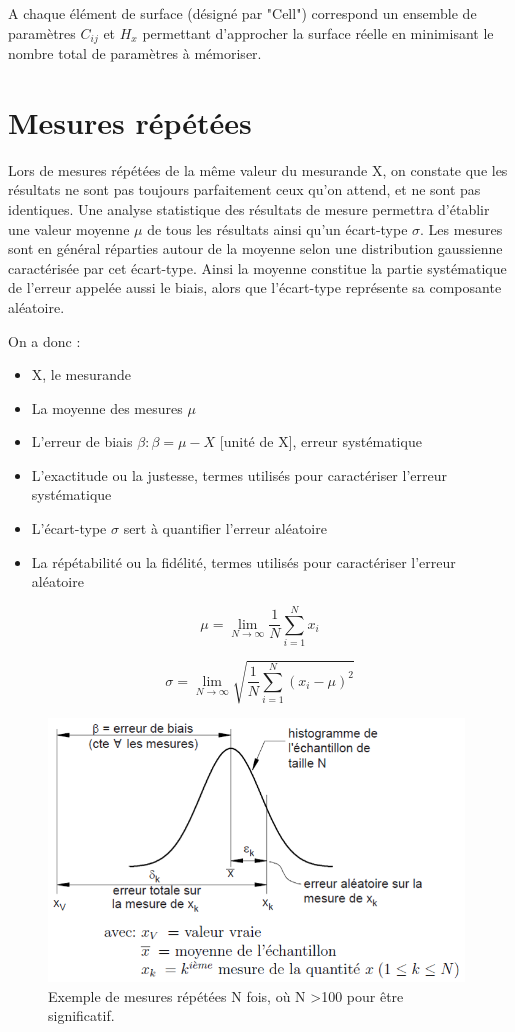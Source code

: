 A chaque élément de surface (désigné par "Cell") correspond un ensemble de paramètres $C_{ij}$ et $H_x$ permettant d'approcher la surface réelle en minimisant le nombre total de paramètres à mémoriser.

\section{Mesures répétées}

Lors de mesures répétées de la même valeur du mesurande X, on constate que les résultats ne sont pas toujours parfaitement ceux qu'on attend, et ne sont pas identiques. Une analyse statistique des résultats de mesure permettra d'établir une valeur moyenne $\mu$ de tous les résultats ainsi qu'un écart-type $\sigma$. Les mesures sont en général réparties autour de la moyenne selon une distribution gaussienne caractérisée par cet écart-type. Ainsi la moyenne constitue la partie systématique de l'erreur appelée aussi le biais, alors que l'écart-type représente sa composante aléatoire.

\newpage
On a donc :
\begin{itemize}
\item X, le mesurande
\item La moyenne des mesures $\mu$
\item L'erreur de biais $\beta :  \beta = \mu - X$  [unité de X], erreur systématique
\item L'exactitude ou la justesse, termes utilisés pour caractériser l'erreur systématique
\item L'écart-type $\sigma$ sert à quantifier l'erreur aléatoire
\item La répétabilité ou la fidélité, termes utilisés pour caractériser l'erreur aléatoire
\end{itemize}

\begin{equation}
\mu = \lim\limits_{N \to \infty} \frac{1}{N} \sum_{i=1}^N x_i
\end{equation}

\begin{equation}
\sigma = \lim\limits_{N \to \infty} \sqrt{\frac{1}{N}\sum_{i=1}^N (x_i-\mu)^2}
\end{equation}

\begin{figure}
\centering
\includegraphics[height=7cm]{assets/figures/3_7_Exemple_de_mesures_repetees_N_fois.PNG}
\caption{Exemple de mesures répétées N fois, où N >100 pour être significatif.}
\label{fig:Exemple_de_mesures_repetees_N_fois}
\end{figure}

